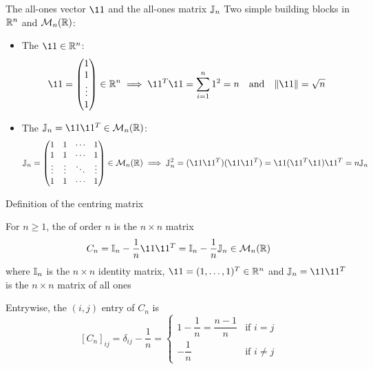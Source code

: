 \documentclass[aspectratio=169]{beamer}\usepackage[]{graphicx}\usepackage[]{xcolor}
\begin{document}
\begin{frame}{The all-ones vector $\11$ and the all-ones matrix $\mathbb{J}_n$}
Two simple building blocks in $\mathbb{R}^n$ and $\mathcal{M}_n(\mathbb{R})$:
\vfill
\begin{itemize}
\item The  $\11\in\IR^n$:
\[
\11 = \begin{pmatrix} 1 \\ 1 \\ \vdots \\ 1 \end{pmatrix} \in \IR^n
\implies \11^T\11 = \sum_{i=1}^n 1^2 = n \quad\text{and}\quad \|\11\| = \sqrt{n}
\]
\vfill
\item The  $\IJ_n = \11\11^T \in \M_n(\IR)$:
\[
\IJ_n = \begin{pmatrix}
1 & 1 & \cdots & 1 \\
1 & 1 & \cdots & 1 \\
\vdots & \vdots & \ddots & \vdots \\
1 & 1 & \cdots & 1
\end{pmatrix} \in \M_n(\IR)
\implies \IJ_n^2 = (\11\11^T)(\11\11^T) = \11(\11^T\11)\11^T = n\IJ_n
\]
\end{itemize}
\end{frame}

\begin{frame}{Definition of the centring matrix}
\begin{importantdefinition}
For $n\ge 1$, the  of order $n$ is the $n\times n$ matrix
\[
C_n = \II_n - \frac{1}{n}\11\11^T = \II_n - \frac{1}{n}\IJ_n \in \M_n(\IR)
\]
where $\mathbb{I}_n$ is the $n\times n$ identity matrix, $\11 = (1,\ldots,1)^T\in\IR^n$ and $\IJ_n = \11\11^T$ is the $n\times n$ matrix of all ones
\end{importantdefinition}
\vfill
Entrywise, the $(i,j)$ entry of $C_n$ is
\[
[C_n]_{ij} = \delta_{ij} - \frac{1}{n} = \begin{cases}
1 - \dfrac{1}{n} = \dfrac{n-1}{n} & \text{if } i = j \\[0.3cm]
-\dfrac{1}{n} & \text{if } i \neq j
\end{cases}
\]
\end{frame}
\end{document}
